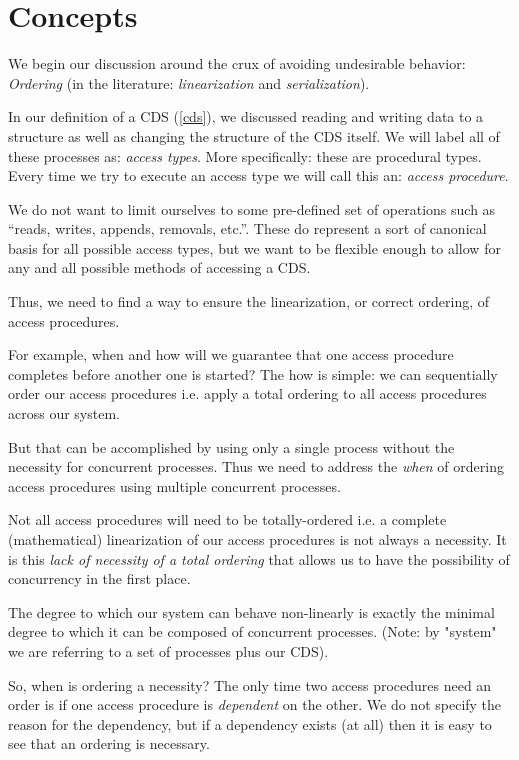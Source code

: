 \section{Concepts}

We begin our discussion around the crux of avoiding undesirable behavior: \textit{Ordering} (in the literature: \textit{linearization} and \textit{serialization}).

In our definition of a CDS (\ref{cds}), we discussed reading and writing data to a structure as well as changing the structure of the CDS itself. We will label all of these processes as: \textit{access types}. More specifically: these are procedural types. Every time we try to execute an access type we will call this an: \textit{access procedure}.

We do not want to limit ourselves to some pre-defined set of operations such as ``reads, writes, appends, removals, etc.''. These do represent a sort of canonical basis for all possible access types, but we want to be flexible enough to allow for any and all possible methods of accessing a CDS.

Thus, we need to find a way to ensure the linearization, or correct ordering, of access procedures. 

For example, when and how will we guarantee that one access procedure completes before another one is started? The how is simple: we can sequentially order our access procedures i.e. apply a total ordering to all access procedures across our system. 

But that can be accomplished by using only a single process without the necessity for concurrent processes. Thus we need to address the \textit{when} of ordering access procedures using multiple concurrent processes.

Not all access procedures will need to be totally-ordered i.e. a complete (mathematical) linearization of our access procedures is not always a necessity. It is this \textit{lack of necessity of a total ordering} that allows us to have the possibility of concurrency in the first place. 

The degree to which our system can behave non-linearly is exactly the minimal degree to which it can be composed of concurrent processes. (Note: by "system" we are referring to a set of processes plus our CDS).

So, when is ordering a necessity? The only time two access procedures need an order is if one access procedure is \textit{dependent} on the other. We do not specify the reason for the dependency, but if a dependency exists (at all) then it is easy to see that an ordering is necessary.

